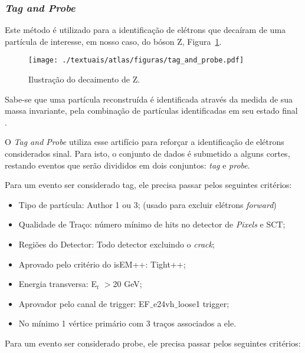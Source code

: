 \subsubsection{\emph{Tag and Probe}}\label{sec:tap}

Este método é utilizado para a identificação de elétrons que decaíram de uma partícula de interesse, em nosso caso, do bóson Z, Figura~\ref{fig:3T18}.

\begin{figure}[h!]
	\centering
	\texttt{[image: ./textuais/atlas/figuras/tag\_and\_probe.pdf]}\\
	\caption{Ilustração do decaimento de Z.}
	\label{fig:3T18}
\end{figure}
	
Sabe-se que uma partícula reconstruída é identificada através da medida de sua massa invariante, pela combinação de partículas identificadas em seu estado final \cite{sundaresan2001handbook}.
	
O \emph{Tag and Probe} \cite{aad2012electron} utiliza esse artifício para reforçar a identificação de elétrons considerados sinal. Para isto, o conjunto de dados é submetido a alguns cortes, restando eventos que serão divididos em dois conjuntos: \emph{tag} e \emph{probe}.
	
Para um evento ser considerado tag, ele precisa passar pelos seguintes critérios:

\begin{itemize}
  \item Tipo de partícula: Author 1 ou 3; (usado para excluir elétrons \emph{forward})
  \item Qualidade de Traço: número mínimo de hits no detector de \emph{Pixels} e SCT;
  \item Regiões do Detector: Todo detector excluindo o \emph{crack};
  \item Aprovado pelo critério do isEM++: Tight++;
  \item Energia transversa: E${_t}$ $>$20 GeV;
  \item Aprovador pelo canal de trigger: EF$\underline{\hspace{.05in}}$e24vh$\underline{\hspace{.05in}}$loose1 trigger;
  \item No mínimo 1 vértice primário com 3 traços associados a ele.
\end{itemize}

Para um evento ser considerado probe, ele precisa passar pelos seguintes  critérios:

